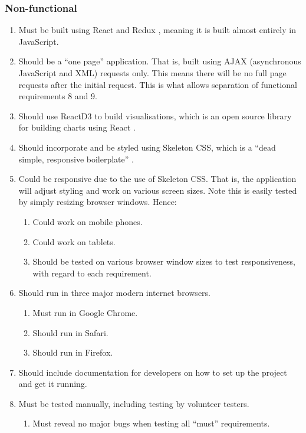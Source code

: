 \documentclass[11pt,openright,a4paper]{report}
\begin{document}
\subsubsection{Non-functional}
\begin{enumerate}
\item Must be built using React \parencite{react} and Redux \parencite{redux}, meaning it is built almost entirely in JavaScript.
\item Should be a \enquote{one page} application. That is, built using AJAX (asynchronous JavaScript and XML) requests only. This means there will be no full page requests after the initial request. This is what allows separation of functional requirements 8 and 9.
\item Should use ReactD3 to build visualisations, which is an open source library for building charts using React \parencite{reactd3}.
\item Should incorporate and be styled using Skeleton CSS, which is a \enquote{dead simple, responsive boilerplate} \parencite{skeletoncss}.
\item Could be responsive due to the use of Skeleton CSS. That is, the application will adjust styling and work on various screen sizes. Note this is easily tested by simply resizing browser windows. Hence:
  \begin{enumerate}
  \item Could work on mobile phones.
  \item Could work on tablets.
  \item Should be tested on various browser window sizes to test responsiveness, with regard to each requirement.
  \end{enumerate}
\item Should run in three major modern internet browsers.
  \begin{enumerate}
  \item Must run in Google Chrome.
  \item Should run in Safari.
  \item Should run in Firefox.
  \end{enumerate}
\item Should include documentation for developers on how to set up the project and get it running.
\item Must be tested manually, including testing by volunteer testers.
  \begin{enumerate}
  \item Must reveal no major bugs when testing all \enquote{must} requirements.

\end{enumerate}
\end{enumerate}
\end{document}
